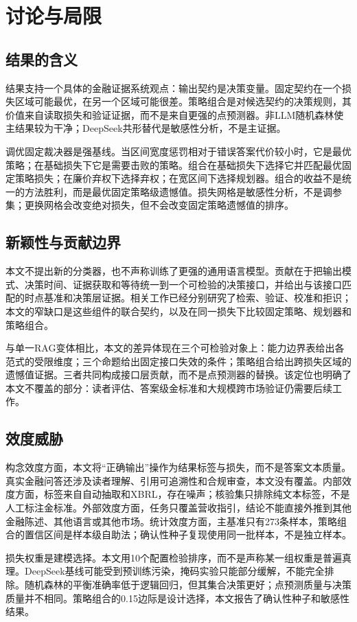 \documentclass[12pt,openany]{ctexbook}
\begin{document}
\chapter{讨论与局限}
\label{ch:discussion}

\section{结果的含义}
结果支持一个具体的金融证据系统观点：输出契约是决策变量。固定契约在一个损失区域可能最优，在另一个区域可能很差。策略组合是对候选契约的决策规则，其价值来自读取损失和验证证据，而不是来自更强的点预测器。非LLM随机森林使主结果较为干净；DeepSeek共形替代是敏感性分析，不是主证据。\par
调优固定裁决器是强基线。当区间宽度惩罚相对于错误答案代价较小时，它是最优策略；在基础损失下它是需要击败的策略。组合在基础损失下选择它并匹配最优固定策略损失；在廉价弃权下选择弃权；在宽区间下选择规划器。组合的收益不是统一的方法胜利，而是最优固定策略级遗憾值。损失网格是敏感性分析，不是调参集；更换网格会改变绝对损失，但不会改变固定策略遗憾值的排序。\par

\section{新颖性与贡献边界}
本文不提出新的分类器，也不声称训练了更强的通用语言模型。贡献在于把输出模式、决策时间、证据获取和等待统一到一个可检验的决策接口，并给出与该接口匹配的时点基准和决策层证据。相关工作已经分别研究了检索、验证、校准和拒识；本文的窄缺口是这些组件的联合契约，以及在同一损失下比较固定策略、规划器和策略组合。\par
与单一RAG变体相比，本文的差异体现在三个可检验对象上：能力边界表给出各范式的受限维度；三个命题给出固定接口失效的条件；策略组合给出跨损失区域的遗憾值证据。三者共同构成接口层贡献，而不是点预测器的替换。该定位也明确了本文不覆盖的部分：读者评估、答案级金标准和大规模跨市场验证仍需要后续工作。\par

\section{效度威胁}
构念效度方面，本文将“正确输出”操作为结果标签与损失，而不是答案文本质量。真实金融问答还涉及读者理解、引用可追溯性和合规审查，本文没有覆盖。内部效度方面，标签来自自动抽取和XBRL，存在噪声；核验集只排除纯文本标签，不是人工标注金标准。外部效度方面，任务只覆盖营收指引，结论不能直接外推到其他金融陈述、其他语言或其他市场。统计效度方面，主基准只有273条样本，策略组合的置信区间是样本级自助法；确认性种子复现使用同一批样本，不是独立样本。\par
损失权重是建模选择。本文用10个配置检验排序，而不是声称某一组权重是普遍真理。DeepSeek基线可能受到预训练污染，掩码实验只能部分缓解，不能完全排除。随机森林的平衡准确率低于逻辑回归，但其集合决策更好；点预测质量与决策质量并不相同。策略组合的0.15边际是设计选择，本文报告了确认性种子和敏感性结果。\par
\end{document}
